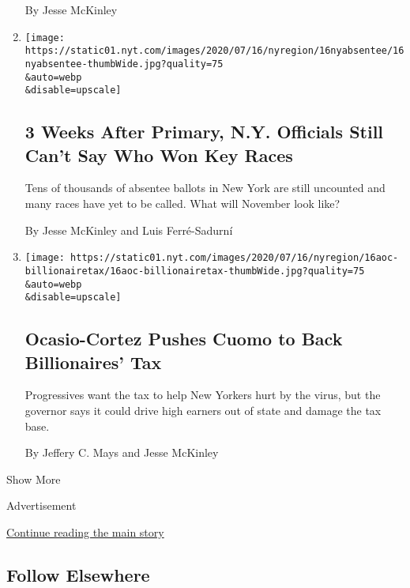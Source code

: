 \begin{enumerate}
  By Jesse McKinley
\item
  \href{/2020/07/17/nyregion/election-absentee-ballots-primary.html}{}

  \texttt{[image: https://static01.nyt.com/images/2020/07/16/nyregion/16nyabsentee/16nyabsentee-thumbWide.jpg?quality=75\\\&auto=webp\\\&disable=upscale]}

  \hypertarget{3-weeks-after-primary-ny-officials-still-cant-say-who-won-key-races}{%
  \subsection{3 Weeks After Primary, N.Y. Officials Still Can't Say Who
  Won Key
  Races}\label{3-weeks-after-primary-ny-officials-still-cant-say-who-won-key-races}}

  Tens of thousands of absentee ballots in New York are still uncounted
  and many races have yet to be called. What will November look like?

  By Jesse McKinley and Luis Ferré-Sadurní
\item
  \href{/2020/07/16/nyregion/aoc-billionaires-tax.html}{}

  \texttt{[image: https://static01.nyt.com/images/2020/07/16/nyregion/16aoc-billionairetax/16aoc-billionairetax-thumbWide.jpg?quality=75\\\&auto=webp\\\&disable=upscale]}

  \hypertarget{ocasio-cortez-pushes-cuomo-to-back-billionaires-tax}{%
  \subsection{Ocasio-Cortez Pushes Cuomo to Back Billionaires'
  Tax}\label{ocasio-cortez-pushes-cuomo-to-back-billionaires-tax}}

  Progressives want the tax to help New Yorkers hurt by the virus, but
  the governor says it could drive high earners out of state and damage
  the tax base.

  By Jeffery C. Mays and Jesse McKinley
\end{enumerate}

Show More

Advertisement

\protect\hyperlink{after-mid2}{Continue reading the main story}

\hypertarget{follow-elsewhere}{%
\subsection{Follow Elsewhere}\label{follow-elsewhere}}

